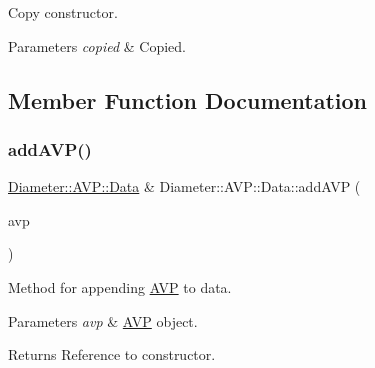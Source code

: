 Copy constructor. 


\begin{DoxyParams}{Parameters}
{\em copied} & Copied. \\
\hline
\end{DoxyParams}


\subsection{Member Function Documentation}
\mbox{\label{classDiameter_1_1AVP_1_1Data_a7d9aba7586083a93c48dd872396cb0e1}} 
\subsubsection{\texorpdfstring{add\+A\+V\+P()}{addAVP()}\hspace{0.1cm}{\footnotesize\ttfamily [1/2]}}
{\footnotesize\ttfamily \hyperlink{classDiameter_1_1AVP_1_1Data}{Diameter\+::\+A\+V\+P\+::\+Data} \& Diameter\+::\+A\+V\+P\+::\+Data\+::add\+A\+VP (\begin{DoxyParamCaption}\item[{const \hyperlink{classDiameter_1_1AVP}{A\+VP} \&}]{avp }\end{DoxyParamCaption})}



Method for appending \hyperlink{classDiameter_1_1AVP}{A\+VP} to data. 


\begin{DoxyParams}{Parameters}
{\em avp} & \hyperlink{classDiameter_1_1AVP}{A\+VP} object. \\
\hline
\end{DoxyParams}
\begin{DoxyReturn}{Returns}
Reference to constructor. 
\end{DoxyReturn}
\mbox{\label{classDiameter_1_1AVP_1_1Data_a36ab07b5614a88fad586d67c5c6155aa}} 
